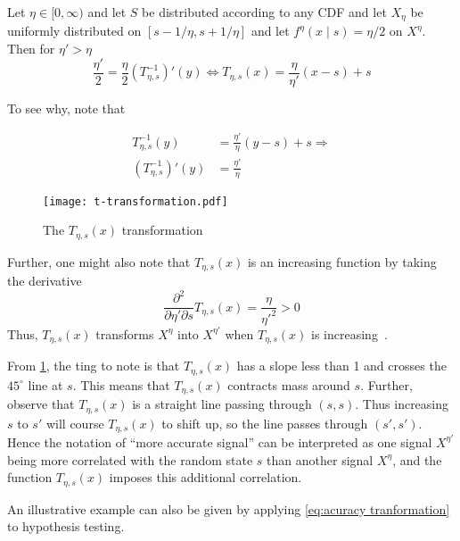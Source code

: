 \begin{example}\label{ex:t-transformation-1}
Let  $\eta\in[0,\infty)$ and let $S$ be distributed according to any CDF and let $X_{\eta}$ be uniformly distributed on $[s-1/\eta,s+1/\eta]$ and let $f^\eta(x\mid s)=\eta\big /2$ on $X^\eta$. Then for $\eta'>\eta$
\[
	\frac{\eta'}{2}=\frac{\eta}{2}\left(T_{\eta,s}^{-1}\right)'(y)\Leftrightarrow T_{\eta,s}(x)=\frac{\eta}{\eta'}(x-s)+s
\]

To see why, note that

\begin{align*}
	T^{-1}_{\eta,s}(y)               &=\frac{\eta'}{\eta}(y-s)+s \Rightarrow \\
	\left(T^{-1}_{\eta,s}\right)'(y) &=\frac{\eta'}{\eta}
\end{align*}

\begin{figure}
	\texttt{[image: t-transformation.pdf]}
	\caption{\label{fig:t-transformation}The $T_{\eta,s}(x)$ transformation}
\end{figure}

Further, one might also note that $T_{\eta,s}(x)$ is an increasing function by taking the derivative
\[
	\frac{\partial^2}{\partial \eta'\partial s}T_{\eta,s}(x)=\frac{\eta}{\eta'^2}>0
\]
Thus, $T_{\eta,s}(x)$ transforms $X^{\eta}$ into $X^{\eta'}$ when $T_{\eta,s}(x)$ is increasing~\citep{Persico1996Information}.

From \cref{fig:t-transformation}, the ting to note is that $T_{\eta,s}(x)$ has a slope less than 1 and crosses the $45^\circ$ line at $s$. This means that $T_{\eta,s}(x)$ contracts mass around $s$. Further, observe that $T_{\eta,s}(x)$ is a straight line passing through $(s,s)$. Thus increasing $s$ to $s'$ will course $T_{\eta,s}(x)$ to shift up, so the line passes through $(s',s')$. Hence the notation of ``more accurate signal'' can be interpreted as one signal $X^{\eta'}$ being more correlated with the random state $s$ than another signal $X^\eta$, and the function $T_{\eta,s}(x)$ imposes this additional correlation.
\end{example}

An illustrative example can also be given by applying \cref{eq:acuracy tranformation} to hypothesis testing.

